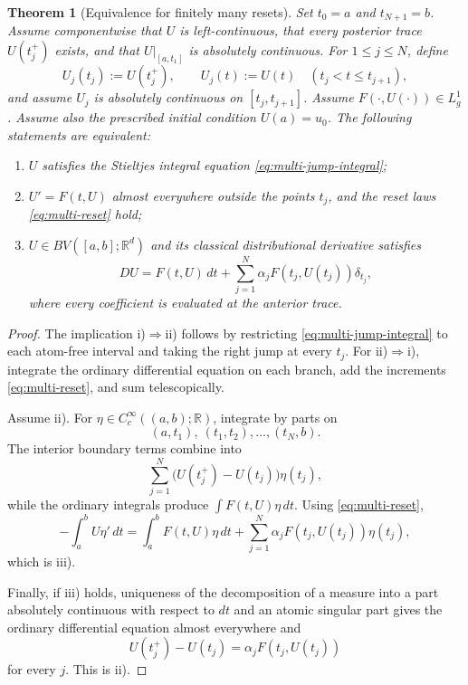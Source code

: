 \documentclass[preprint,12pt]{elsarticle}
\newcommand{\newrev}[1]{{\color{red}#1}}
\newenvironment{finalrevision}{\begingroup\color{red}}{\endgroup}
\newcommand{\newrev}[1]{#1}
\newenvironment{finalrevision}{}{}
\newtheorem{theorem}{Theorem}[section]
\theoremstyle{definition}
\theoremstyle{remark}
\newcommand{\R}{\mathbb R}
\begin{document}
\begin{theorem}[Equivalence for finitely many resets]\label{thm:finite-classical-equivalence}
\begin{finalrevision}
Set \(t_0=a\) and \(t_{N+1}=b\). Assume componentwise that \(U\) is
left-continuous, that every posterior trace \(U(t_j^+)\) exists, and that
\(U|_{[a,t_1]}\) is absolutely continuous. For \(1\le j\le N\), define
\[
 U_j(t_j):=U(t_j^+),\qquad U_j(t):=U(t)\quad(t_j<t\le t_{j+1}),
\]
and assume \(U_j\) is absolutely continuous on \([t_j,t_{j+1}]\).
Assume \(F(\cdot,U(\cdot))\in L_g^1\).
\end{finalrevision}
\newrev{Assume also the prescribed initial condition $U(a)=u_0$.} The following statements are equivalent:
\begin{enumerate}[label=\roman*)]
 \item $U$ satisfies the Stieltjes integral equation \eqref{eq:multi-jump-integral};
 \item $U'=F(t,U)$ almost everywhere outside the points $t_j$, and the reset laws \eqref{eq:multi-reset} hold;
 \item $U\in BV([a,b];\R^d)$ and its classical distributional derivative satisfies
 \begin{equation}\label{eq:finite-classical-distribution}
 DU=F(t,U)\,dt
 +\sum_{j=1}^{N}\alpha_jF(t_j,U(t_j))\delta_{t_j},
 \end{equation}
 where every coefficient is evaluated at the anterior trace.
\end{enumerate}
\end{theorem}

\begin{proof}
The implication i)$\Rightarrow$ii) follows by restricting \eqref{eq:multi-jump-integral} to each atom-free interval and taking the right jump at every $t_j$. For ii)$\Rightarrow$i), integrate the ordinary differential equation on each branch, add the increments \eqref{eq:multi-reset}, and sum telescopically.

Assume ii). For $\eta\in C_c^\infty((a,b);\R)$, integrate by parts on
\[
 (a,t_1),\ (t_1,t_2),\ldots,(t_N,b).
\]
The interior boundary terms combine into
\[
 \sum_{j=1}^N\bigl(U(t_j^+)-U(t_j)\bigr)\eta(t_j),
\]
while the ordinary integrals produce $\int F(t,U)\eta\,dt$. Using \eqref{eq:multi-reset},
\[
 -\int_a^bU\eta'\,dt
 =\int_a^bF(t,U)\eta\,dt
 +\sum_{j=1}^N\alpha_jF(t_j,U(t_j))\eta(t_j),
\]
which is iii).

Finally, if iii) holds, uniqueness of the decomposition of a measure into a part absolutely continuous with respect to $dt$ and an atomic singular part gives the ordinary differential equation almost everywhere and
\[
 U(t_j^+)-U(t_j)=\alpha_jF(t_j,U(t_j))
\]
for every $j$. This is ii).
\end{proof}
\end{document}
